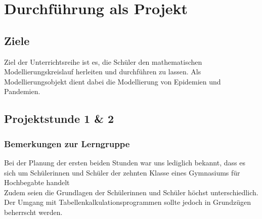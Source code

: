 \section{Durchführung als Projekt}
\subsection{Ziele}
\steffen
Ziel der Unterrichtsreihe ist es, die Schüler den mathematischen Modellierungskreislauf herleiten und durchführen zu lassen. Als Modellierungsobjekt dient dabei die Modellierung von Epidemien und Pandemien. 



\subsection{Projektstunde 1 \& 2}\ellen
\subsubsection{Bemerkungen zur Lerngruppe}\label{ssec:project:34:lerngruppe}
Bei der Planung der ersten beiden Stunden war uns lediglich bekannt, dass es sich um Schülerinnen und Schüler der zehnten Klasse eines Gymnasiums für Hochbegabte handelt\\
Zudem seien die Grundlagen der Schülerinnen und Schüler höchst unterschiedlich. Der Umgang mit Tabellenkalkulationsprogrammen sollte jedoch in Grundzügen beherrscht werden. 

